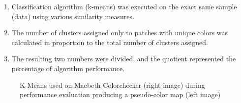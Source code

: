 \documentclass{article}
\begin{document}
{                    \begin{enumerate}
                        \item Classification algorithm (k-means) was executed on the exact same sample (data) using various similarity measures.
                        \item The number of clusters assigned only to patches with unique colors was calculated in proportion to the total number of clusters assigned.
                        \item The resulting two numbers were divided, and the quotient represented the percentage of algorithm performance.
                    \end{enumerate}
                    
                    \vspace*{2\baselineskip}
                    \begin{figure}[h]
                        \centering
                        \qquad
                        \caption{K-Means used on Macbeth Colorchecker (right image) during performance evaluation producing a pseudo-color map (left image)}%
                        \label{fig:example}
                    \end{figure}
                    \vspace*{4\baselineskip}
                    
}
\end{document}

